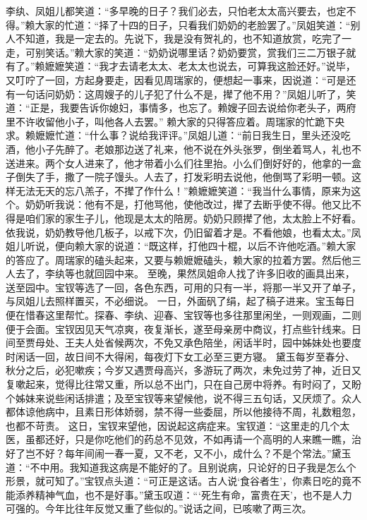 \documentclass[12pt,oneside]{book}
\begin{document}
李纨、凤姐儿都笑道：“多早晚的日子？我们必去，只怕老太太高兴要去，也定不得。”赖大家的忙道：“择了十四的日子，只看我们奶奶的老脸罢了。”凤姐笑道：“别人不知道，我是一定去的。先说下，我是没有贺礼的，也不知道放赏，吃完了一走，可别笑话。”赖大家的笑道：“奶奶说哪里话？奶奶要赏，赏我们三二万银子就有了。”赖嬷嬷笑道：“我才去请老太太、老太太也说去，可算我这脸还好。”说毕，又叮咛了一回，方起身要走，因看见周瑞家的，便想起一事来，因说道：“可是还有一句话问奶奶：这周嫂子的儿子犯了什么不是，撵了他不用？”凤姐儿听了，笑道：“正是，我要告诉你媳妇，事情多，也忘了。赖嫂子回去说给你老头子，两府里不许收留他小子，叫他各人去罢。”
赖大家的只得答应着。周瑞家的忙跪下央求。赖嬷嬷忙道：“什么事？说给我评评。”凤姐儿道：“前日我生日，里头还没吃酒，他小子先醉了。老娘那边送了礼来，他不说在外头张罗，倒坐着骂人，礼也不送进来。两个女人进来了，他才带着小么们往里抬。小么们倒好好的，他拿的一盒子倒失了手，撒了一院子馒头。人去了，打发彩明去说他，他倒骂了彩明一顿。这样无法无天的忘八羔子，不撵了作什么！”赖嬷嬷笑道：“我当什么事情，原来为这个。奶奶听我说：他有不是，打他骂他，使他改过，撵了去断乎使不得。他又比不得是咱们家的家生子儿，他现是太太的陪房。奶奶只顾撵了他，太太脸上不好看。依我说，奶奶教导他几板子，以戒下次，仍旧留着才是。不看他娘，也看太太。”凤姐儿听说，便向赖大家的说道：“既这样，打他四十棍，以后不许他吃酒。”赖大家的答应了。周瑞家的磕头起来，又要与赖嬷嬷磕头，赖大家的拉着方罢。然后他三人去了，李纨等也就回园中来。
至晚，果然凤姐命人找了许多旧收的画具出来，送至园中。宝钗等选了一回，各色东西，可用的只有一半，将那一半又开了单子，与凤姐儿去照样置买，不必细说。
一日，外面矾了绢，起了稿子进来。宝玉每日便在惜春这里帮忙。探春、李纨、迎春、宝钗等也多往那里闲坐，一则观画，二则便于会面。宝钗因见天气凉爽，夜复渐长，遂至母亲房中商议，打点些针线来。日间至贾母处、王夫人处省候两次，不免又承色陪坐，闲话半时，园中姊妹处也要度时闲话一回，故日间不大得闲，每夜灯下女工必至三更方寝。
黛玉每岁至春分、秋分之后，必犯嗽疾；今岁又遇贾母高兴，多游玩了两次，未免过劳了神，近日又复嗽起来，觉得比往常又重，所以总不出门，只在自己房中将养。有时闷了，又盼个姊妹来说些闲话排遣；及至宝钗等来望候他，说不得三五句话，又厌烦了。众人都体谅他病中，且素日形体娇弱，禁不得一些委屈，所以他接待不周，礼数粗忽，也都不苛责。
这日，宝钗来望他，因说起这病症来。宝钗道：“这里走的几个太医，虽都还好，只是你吃他们的药总不见效，不如再请一个高明的人来瞧一瞧，治好了岂不好？每年间闹一春一夏，又不老，又不小，成什么？不是个常法。”黛玉道：“不中用。我知道我这病是不能好的了。且别说病，只论好的日子我是怎么个形景，就可知了。”宝钗点头道：“可正是这话。古人说‘食谷者生’，你素日吃的竟不能添养精神气血，也不是好事。”黛玉叹道：“‘死生有命，富贵在天’，也不是人力可强的。今年比往年反觉又重了些似的。”说话之间，已咳嗽了两三次。
\end{document}
